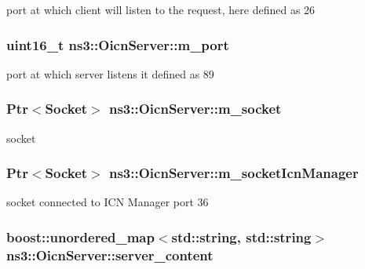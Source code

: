 port at which client will listen to the request, here defined as 26 

\hypertarget{classns3_1_1OicnServer_af323ee83ebbb895c021b3ba2eadae2cc}{
\subsubsection[{m\-\_\-port}]{\setlength{\rightskip}{0pt plus 5cm}uint16\-\_\-t ns3\-::\-Oicn\-Server\-::m\-\_\-port\hspace{0.3cm}{\ttfamily [private]}}}\label{classns3_1_1OicnServer_af323ee83ebbb895c021b3ba2eadae2cc}


port at which server listens it defined as 89 

\hypertarget{classns3_1_1OicnServer_ab5844e0fda8496f62cb0bd472a1e4783}{
\subsubsection[{m\-\_\-socket}]{\setlength{\rightskip}{0pt plus 5cm}Ptr$<$Socket$>$ ns3\-::\-Oicn\-Server\-::m\-\_\-socket\hspace{0.3cm}{\ttfamily [private]}}}\label{classns3_1_1OicnServer_ab5844e0fda8496f62cb0bd472a1e4783}


socket 

\hypertarget{classns3_1_1OicnServer_a836b1c3feef3d7946fd187dec6e4f229}{
\subsubsection[{m\-\_\-socket\-Icn\-Manager}]{\setlength{\rightskip}{0pt plus 5cm}Ptr$<$Socket$>$ ns3\-::\-Oicn\-Server\-::m\-\_\-socket\-Icn\-Manager\hspace{0.3cm}{\ttfamily [private]}}}\label{classns3_1_1OicnServer_a836b1c3feef3d7946fd187dec6e4f229}


socket connected to I\-C\-N Manager port 36 

\hypertarget{classns3_1_1OicnServer_ae9c0c07d3749a24b15ad2cd3e13c52a6}{
\subsubsection[{server\-\_\-content}]{\setlength{\rightskip}{0pt plus 5cm}boost\-::unordered\-\_\-map$<$std\-::string, std\-::string$>$ ns3\-::\-Oicn\-Server\-::server\-\_\-content\hspace{0.3cm}{\ttfamily [private]}}}\label{classns3_1_1OicnServer_ae9c0c07d3749a24b15ad2cd3e13c52a6}


